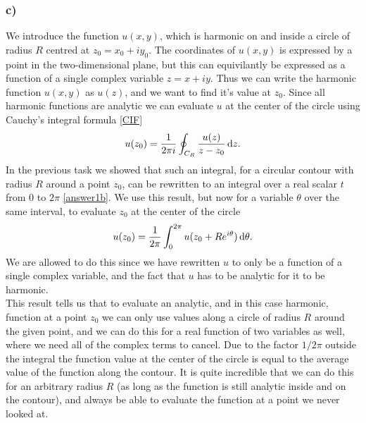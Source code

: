 \documentclass[12pt,twoside]{article}
\begin{document}
\subsubsection*{c)}
We introduce the function $u(x, y)$, which is harmonic on and inside a circle of radius $R$ centred at $z_0=x_0+iy_0$. The coordinates of $u(x, y)$ is expressed by a point in the two-dimensional plane, but this can equivilantly be expressed as a function of a single complex variable $z=x+iy$. Thus we can write the harmonic function $u(x, y)$ as $u(z)$, and we want to find it's value at $z_0$. Since all harmonic functions are analytic we can evaluate $u$ at the center of the circle using Cauchy's integral formula \eqref{CIF}
\begin{equation}
  u(z_0) = \frac{1}{2\pi i} \oint_{C_R} \frac{u(z)}{z-z_0}\dif z.
\end{equation}
In the previous task we showed that such an integral, for a circular contour with radius $R$ around a point $z_0$, can be rewritten to an integral over a real scalar $t$ from $0$ to $2\pi$ \eqref{answer1b}. We use this result, but now for a variable $\theta$ over the same interval, to evaluate $z_0$ at the center of the circle
\begin{equation}
  u(z_0) = \frac{1}{2\pi} \int_{0}^{2\pi} u(z_0+Re^{i\theta}) \dif \theta.
\end{equation}
We are allowed to do this since we have rewritten $u$ to only be a function of a single complex variable, and the fact that $u$ has to be analytic for it to be harmonic.\\
This result tells us that to evaluate an analytic, and in this case harmonic, function at a point $z_0$ we can only use values along a circle of radius $R$ around the given point, and we can do this for a real function of two variables as well, where we need all of the complex terms to cancel. Due to the factor $1/2\pi$ outside the integral the function value at the center of the circle is equal to the average value of the function along the contour. It is quite incredible that we can do this for an arbitrary radius $R$ (as long as the function is still analytic inside and on the contour), and always be able to evaluate the function at a point we never looked at.
\end{document}
